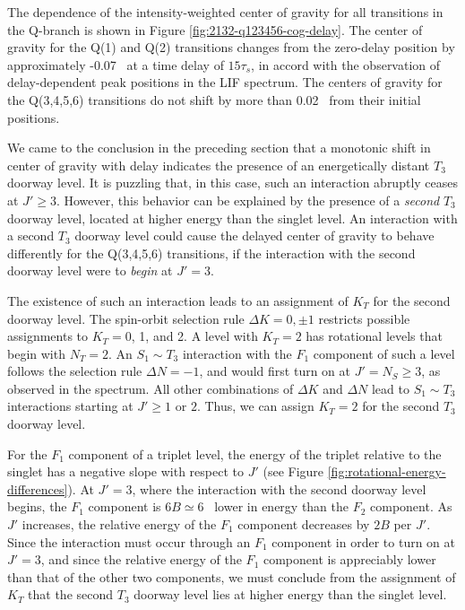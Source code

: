 \documentclass[12pt]{mitthesis}
\begin{document}
The dependence of the intensity-weighted center of gravity for all
transitions in the Q-branch is shown in Figure
\ref{fig:2132-q123456-cog-delay}.  The center of gravity for the Q(1)
and Q(2) transitions changes from the zero-delay position by
approximately -0.07 \rcm\ at a time delay of $15\tau_s$, in accord
with the observation of delay-dependent peak positions in the LIF
spectrum.  The centers of gravity for the Q(3,4,5,6) transitions do
not shift by more than 0.02 \rcm\ from their initial positions.

We came to the conclusion in the preceding section that a monotonic
shift in center of gravity with delay indicates the presence of an
energetically distant $T_3$ doorway level.  It is puzzling that, in
this case, such an interaction abruptly ceases at $J' \geq 3$.
However, this behavior can be explained by the presence of a
\emph{second} $T_3$ doorway level, located at higher energy than the
singlet level.  An interaction with a second $T_3$ doorway level could
cause the delayed center of gravity to behave differently for the
Q(3,4,5,6) transitions, if the interaction with the second doorway
level were to \emph{begin} at $J'=3$.

The existence of such an interaction leads to an assignment of $K_T$
for the second doorway level.  The spin-orbit selection rule $\Delta K
= 0, \pm 1$ restricts possible assignments to $K_T=$0, 1, and 2.  A
level with $K_T=2$ has rotational levels that begin with $N_T=2$.  An
$S_1 \sim T_3$ interaction with the $F_1$ component of such a level
follows the selection rule $\Delta N = -1$, and would first turn on at
$J'=N_S \geq 3$, as observed in the spectrum.  All other combinations
of $\Delta K$ and $\Delta N$ lead to $S_1 \sim T_3$ interactions
starting at $J' \geq 1$ or $2$.  Thus, we can assign $K_T=2$ for the
second $T_3$ doorway level.

For the $F_1$ component of a triplet level, the energy of the triplet
relative to the singlet has a negative slope with respect to $J'$ (see
Figure \ref{fig:rotational-energy-differences}).  At $J'=3$, where the
interaction with the second doorway level begins, the $F_1$ component
is $6B \simeq 6$ \rcm\ lower in energy than the $F_2$ component.  As
$J'$ increases, the relative energy of the $F_1$ component decreases
by $2B$ per $J'$.  Since the interaction must occur through an $F_1$
component in order to turn on at $J'=3$, and since the relative energy
of the $F_1$ component is appreciably lower than that of the other two
components, we must conclude from the assignment of $K_T$ that the
second $T_3$ doorway level lies at higher energy than the singlet
level.
\end{document}
